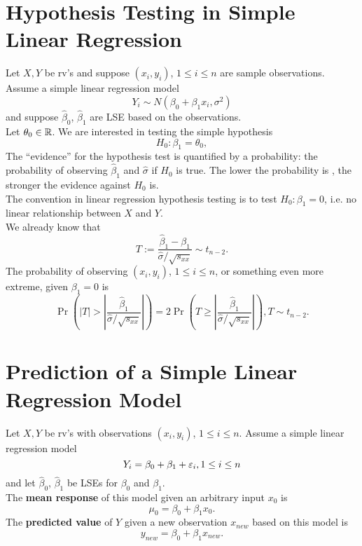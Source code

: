 \documentclass[11pt,fleqn]{book} %
\begin{document}

\section{Hypothesis Testing in Simple Linear Regression}

\begin{remark} \label{rmk:121}
Let \(X, Y\) be rv's and suppose \((x_i, y_i)\), \(1 \leq i \leq n\) are sample observations. Assume a simple linear regression model
\[
Y_i \sim N(\beta_0 + \beta_1x_i, \sigma^2)
\]
and suppose \(\hat{\beta}_0\), \(\hat{\beta}_1\) are LSE based on the observations. \\
\indent Let \(\theta_0 \in \mathbb{R}\). We are interested in testing the simple hypothesis
\[
H_0: \beta_1 = \theta_0,
\]
The ``evidence'' for the hypothesis test is quantified by a probability: the probability of observing \(\hat{\beta}_1\) and \(\hat{\sigma}\) if \(H_0\) is true. The lower the probability is , the stronger the evidence against \(H_0\) is. \\
\indent The convention in linear regression hypothesis testing is to test \(H_0: \beta_1 = 0\), i.e. no linear relationship between \(X\) and \(Y\). \\
\indent We already know that
\[
T := \frac{\hat{\beta}_1 - \beta_1}{\hat{\sigma} / \sqrt{s_{xx}}} \sim t_{n - 2}.
\]
\indent The probability of observing \((x_i, y_i)\), \(1 \leq i \leq n\), or something even more extreme, given \(\beta_1 = 0\) is
\[
\Pr\left(|T| > \left|\frac{\hat{\beta}_1}{\hat{\sigma} / \sqrt{s_{xx}}}\right|\right) = 2\Pr\left(T \geq \left|\frac{\hat{\beta}_1}{\hat{\sigma} / \sqrt{s_{xx}}}\right|\right), T \sim t_{n - 2}.
\]
\end{remark}


\section{Prediction of a Simple Linear Regression Model}

\begin{definition} \label{def:131}
Let \(X, Y\) be rv's with observations \((x_i, y_i)\), \(1 \leq i \leq n\). Assume a simple linear regression model
\[
Y_i = \beta_0 + \beta_1 + \varepsilon_i, 1\leq i \leq n
\]
and let \(\hat{\beta}_0\), \(\hat{\beta}_1\) be LSEs for \(\beta_0\) and \(\beta_1\). \\
\indent The \textbf{mean response} of this model given an arbitrary input \(x_0\) is
\[
\mu_0 = \beta_0 + \beta_1x_0.
\]
\indent The \textbf{predicted value} of \(Y\) given a new observation \(x_{new}\) based on this model is
\[
y_{new} = \beta_0 + \beta_1x_{new}.
\]
\end{definition}
\end{document}
